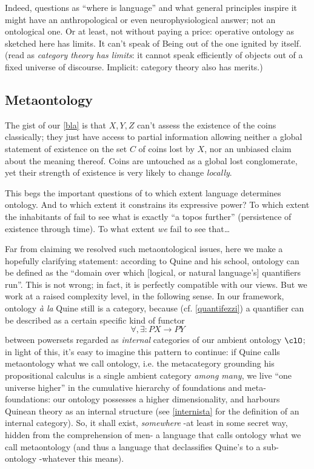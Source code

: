 Indeed, questions as ``where is language'' and what general principles inspire it might have an anthropological or even neurophysiological answer; not an ontological one. Or at least, not without paying a price: operative ontology as sketched here has limits. It can't speak of Being out of the one ignited by itself. (read as \emph{category theory has limits}: it cannot speak efficiently of objects out of a fixed universe of discourse. Implicit: category theory also has merits.)
\subsection{Metaontology} \label{metaon}
The gist of our \autoref{bla} is that $X,Y,Z$ can't assess the existence of the coins classically; they just have access to partial information allowing neither a global statement of existence on the set $C$ of coins lost by $X$, nor an unbiased claim about the meaning thereof. Coins are untouched as a global lost conglomerate, yet their strength of existence is very likely to change \emph{locally}.

This begs the important questions of to which extent language determines ontology. And to which extent it constrains its expressive power? To which extent the inhabitants of \tlon fail to see what is exactly ``a topos further'' (persistence of existence through time). To what extent \emph{we} fail to see that\dots

Far from claiming we resolved such metaontological issues, here we make a hopefully clarifying statement: according to Quine and his school, ontology can be defined as the ``domain over which [logical, or natural language's] quantifiers run''. This is not wrong; in fact, it is perfectly compatible with our views. But we work at a raised complexity level, in the following sense. In our framework, ontology \emph{à la} Quine still is a category, because (cf. \autoref{quantifezzi}) a quantifier can be described as a certain specific kind of functor
\[\forall,\exists : PX \to PY\]
between powersets regarded as \emph{internal} categories of our ambient ontology $\clO$; in light of this, it's easy to imagine this pattern to continue: if Quine calls metaontology what we call ontology, i.e. the metacategory grounding his propositional calculus is a single ambient category \emph{among many}, we live ``one universe higher'' in the cumulative hierarchy of foundations and meta-foundations: our ontology possesses a higher dimensionality, and harbours Quinean theory as an internal structure (see \autoref{internista} for the definition of an internal category). So, it shall exist, \emph{somewhere} -at least in some secret way, hidden from the comprehension of men- a language that calls ontology what we call metaontology (and thus a language that declassifies Quine's to a sub-ontology -whatever this means).

